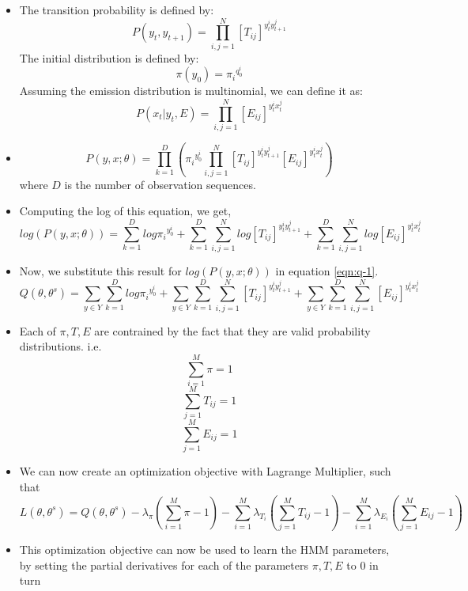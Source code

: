 \documentclass[parskip=half]{scrartcl}
\begin{document}
\begin{itemize}
\begin{itemize}
        \end{itemize}
        \item 
        The transition probability is defined by:
        $$P(y_t,y_{t+1}) = \prod^N_{i,j = 1} [T_{ij}]^{y_t^iy_{t+1}^j} $$
        The initial distribution is defined by:
        $$\pi(y_0) = {\pi_i}^{q_0^i} $$
        Assuming the emission distribution is multinomial, we can define it as:
        $$P(x_t|y_t, E) = \prod^N_{i,j = 1} [E_{ij}]^{y_t^ix_t^j} $$
        \item 
        \begin{equation*}
            P(y,x; \theta) = \prod^D_{k=1} ({\pi_i}^{y_0^i} \prod^N_{i,j=1} [T_{ij}]^{y_t^iy_{t+1}^j} [E_{ij}]^{y_t^ix_t^j} )
        \end{equation*}
        where $D$ is the number of observation sequences.
        \item 
        Computing the log of this equation, we get,
        \begin{equation*}
            log(P(y,x; \theta)) = \sum^D_{k=1} log {\pi_i}^{y_0^i} + \sum^D_{k=1}\sum^N_{i,j=1} log [T_{ij}]^{y_t^iy_{t+1}^j} + \sum^D_{k=1}\sum^N_{i,j=1} log [E_{ij}]^{y_t^ix_t^j} 
        \end{equation*}
        \item 
        Now, we substitute this result for $log(P(y,x; \theta))$ in equation \ref{eqn:q-1}.
        \begin{equation*}
            Q(\theta, \theta^s) = \sum_{y \in Y} \sum^D_{k=1} log {\pi_i}^{y_0^i} + \sum_{y \in Y} \sum^D_{k=1}\sum^N_{i,j=1} [T_{ij}]^{y_t^iy_{t+1}^j} + \sum_{y \in Y} \sum^D_{k=1}\sum^N_{i,j=1} [E_{ij}]^{y_t^ix_t^j} 
        \end{equation*}
        \item 
        Each of $\pi, T, E$ are contrained by the fact that they are valid probability distributions. i.e.
        \begin{equation*}
            \sum^M_{i=1} \pi = 1
        \end{equation*}
        \begin{equation*}
            \sum^M_{j=1} T_{ij} = 1
        \end{equation*}
        \begin{equation*}
            \sum^M_{j=1} E_{ij} = 1
        \end{equation*}
        \item 
        We can now create an optimization objective with Lagrange Multiplier, such that
        \begin{equation} \label{eqn:optimization-objective}
            L(\theta, \theta^s) = Q(\theta, \theta^s) - \lambda_{\pi} (\sum^M_{i=1} \pi - 1) - \sum^M_{i=1} \lambda_{T_i} (\sum^M_{j=1} T_{ij} - 1) - \sum^M_{i=1} \lambda_{E_i} (\sum^M_{j=1} E_{ij} - 1)
        \end{equation}
        \item 
        This optimization objective can now be used to learn the HMM parameters, by setting the partial derivatives for each of the parameters $\pi, T, E$ to 0 in turn 
    \end{itemize}
\end{document}
